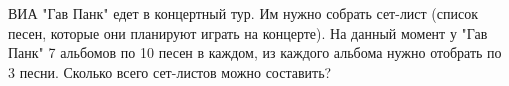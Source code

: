 \question
ВИА "Гав Панк" едет в концертный тур. Им нужно собрать сет-лист (список песен, которые они планируют играть на концерте). На данный момент у "Гав Панк" 7 альбомов по 10 песен в каждом, из каждого альбома нужно отобрать по 3 песни. Сколько всего сет-листов можно составить?
